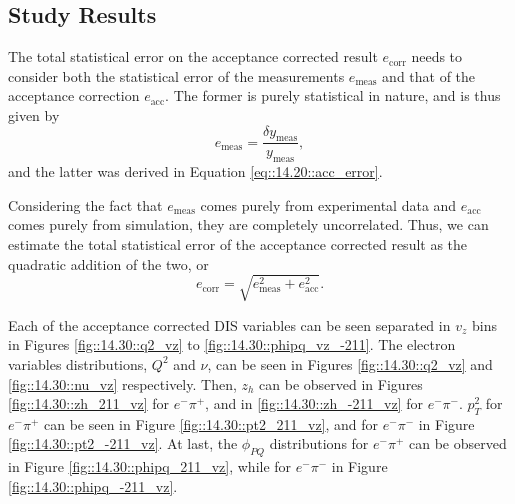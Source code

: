 \subsection{Study Results}
\label{14.30::study_results}


    The total statistical error on the acceptance corrected result $e_\text{corr}$ needs to consider both the statistical error of the measurements $e_\text{meas}$ and that of the acceptance correction $e_\text{acc}$.
    The former is purely statistical in nature, and is thus given by
    \begin{equation*}
        e_\text{meas} = \frac{\delta y_\text{meas}}{y_\text{meas}},
    \end{equation*}
    and the latter was derived in Equation \eqref{eq::14.20::acc_error}.

    Considering the fact that $e_\text{meas}$ comes purely from experimental data and $e_\text{acc}$ comes purely from simulation, they are completely uncorrelated.
    Thus, we can estimate the total statistical error of the acceptance corrected result as the quadratic addition of the two, or
    \begin{equation*}
        e_\text{corr} = \sqrt{e_\text{meas}^2 + e_\text{acc}^2}.
    \end{equation*}


    Each of the acceptance corrected DIS variables can be seen separated in $v_z$ bins in Figures \ref{fig::14.30::q2_vz} to \ref{fig::14.30::phipq_vz_-211}.
    The electron variables distributions, $Q^2$ and $\nu$, can be seen in Figures \ref{fig::14.30::q2_vz} and \ref{fig::14.30::nu_vz} respectively.
    Then, $z_h$ can be observed in Figures \ref{fig::14.30::zh_211_vz} for $e^-\pi^+$, and in \ref{fig::14.30::zh_-211_vz} for $e^-\pi^-$.
    $p_T^2$ for $e^-\pi^+$ can be seen in Figure \ref{fig::14.30::pt2_211_vz}, and for $e^-\pi^-$ in Figure \ref{fig::14.30::pt2_-211_vz}.
    At last, the $\phi_{PQ}$ distributions for $e^-\pi^+$ can be observed in Figure \ref{fig::14.30::phipq_211_vz}, while for $e^-\pi^-$ in Figure \ref{fig::14.30::phipq_-211_vz}.

